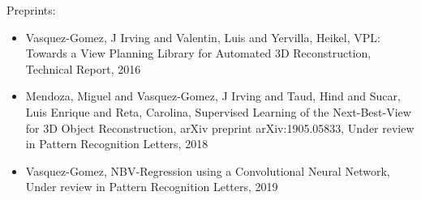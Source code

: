 
 Preprints:\begin{itemize} 
\item Vasquez-Gomez, J Irving and Valentin, Luis and Yervilla, Heikel, VPL: Towards a View Planning Library for Automated 3D Reconstruction, Technical Report, 2016 
\item Mendoza, Miguel and Vasquez-Gomez, J Irving and Taud, Hind and Sucar, Luis Enrique and Reta, Carolina, Supervised Learning of the Next-Best-View for 3D Object Reconstruction, arXiv preprint arXiv:1905.05833, Under review in Pattern Recognition Letters, 2018 
\item Vasquez-Gomez, NBV-Regression using a Convolutional Neural Network, Under review in Pattern Recognition Letters, 2019 
\end{itemize} 
